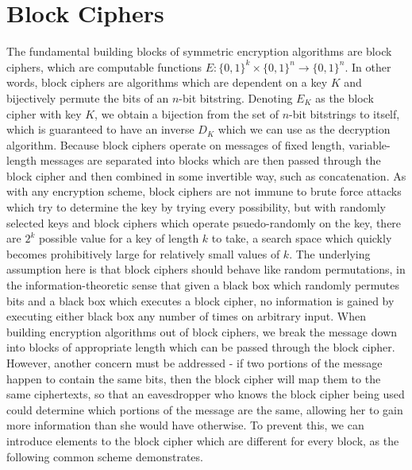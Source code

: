 \documentclass{article}
\begin{document}
\section{Block Ciphers}
The fundamental building blocks of symmetric encryption algorithms are block ciphers, which are computable functions $ E: \{ 0, 1 \}^k \times \{ 0, 1 \}^n \rightarrow \{ 0, 1 \}^n $. In other words, block ciphers are algorithms which are dependent on a key $ K $ and bijectively permute the bits of an $ n $-bit bitstring. Denoting $ E_K $ as the block cipher with key $ K $, we obtain a bijection from the set of $ n $-bit bitstrings to itself, which is guaranteed to have an inverse $ D_K $ which we can use as the decryption algorithm. Because block ciphers operate on messages of fixed length, variable-length messages are separated into blocks which are then passed through the block cipher and then combined in some invertible way, such as concatenation.
\newline \newline
As with any encryption scheme, block ciphers are not immune to brute force attacks which try to determine the key by trying every possibility, but with randomly selected keys and block ciphers which operate psuedo-randomly on the key, there are $ 2^k $ possible value for a key of length $ k $ to take, a search space which quickly becomes prohibitively large for relatively small values of $ k $. The underlying assumption here is that block ciphers should behave like random permutations, in the information-theoretic sense that given a black box which randomly permutes bits and a black box which executes a block cipher, no information is gained by executing either black box any number of times on arbitrary input.
\newline \newline
When building encryption algorithms out of block ciphers, we break the message down into blocks of appropriate length which can be passed through the block cipher. However, another concern must be addressed - if two portions of the message happen to contain the same bits, then the block cipher will map them to the same ciphertexts, so that an eavesdropper who knows the block cipher being used could determine which portions of the message are the same, allowing her to gain more information than she would have otherwise. To prevent this, we can introduce elements to the block cipher which are different for every block, as the following common scheme demonstrates.
\newline \newline
\end{document}

